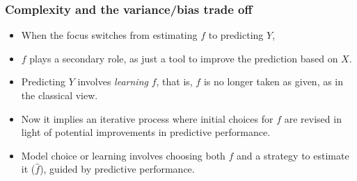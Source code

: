 \documentclass[
  shownotes,
  xcolor={svgnames},
  hyperref={colorlinks,citecolor=DarkBlue,linkcolor=andesred,urlcolor=DarkBlue}
  , aspectratio=169]{beamer}
\begin{document}
\begin{frame}
\frametitle{Complexity and the variance/bias trade off}

\begin{itemize}

  \item When the focus switches from estimating $f$ to predicting $Y$, 
  \medskip
  \item $f$ plays a secondary role, as just a tool to improve the prediction based on $X$.
  \medskip
  \item  Predicting $Y$ involves \emph{learning} $f$, that is, $f$ is no longer taken as given, as in the classical view. 
  \medskip
  \item Now it implies an iterative process where initial choices for $f$ are revised in light of potential improvements in predictive performance.
  \medskip
  \item Model choice or learning involves choosing both $f$ and a strategy to estimate it ($\hat f$), guided by predictive performance. 

\end{itemize}


\end{frame}
\end{document}
